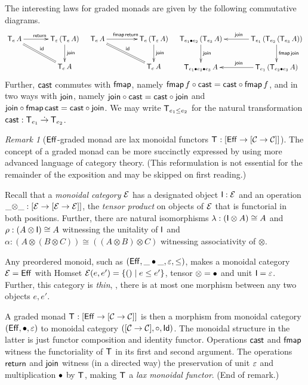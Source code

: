 \documentclass[acmsmall,review,anonymous]{acmart}\settopmatter{printfolios=true,printccs=false,printacmref=false}
\theoremstyle{remark}
\newtheorem{remark}{Remark}
\begin{document}
The interesting laws for graded monads are given by the following
commutative diagrams.
\[
\xymatrix@C=8ex{
  \T[e]\,A     \ar[r]^{\treturn} \ar@{=}[dr]^{\tid}
& \T[\Ge]\,(\T[e]\,A) \ar[d]^{\tjoin}
\\
& \T[e]\,A
}
\quad
\xymatrix@C=10ex{
  \T[e]\,A     \ar[r]^{\tfmap\,\treturn} \ar@{=}[dr]^{\tid}
& \T[e]\,(\T[\Ge]\,A) \ar[d]^{\tjoin}
\\
& \T[e]\,A
}
\quad
\xymatrix@C=8ex{
  \T[e_1 \bu e_2]\,(\T[e_3]\,A) \ar[d]^{\tjoin}
& \T[e_1]\,(\T[e_2]\,(\T[e_3]\,A)) \ar[l]_{\tjoin} \ar[d]^{\tfmap\,\tjoin}
\\
  \T[e_1 \bu e_2 \bu e_3]\,A
& \T[e_1]\,(\T[e_2 \bu e_3]\,A) \ar[l]_{\tjoin}
}
\]
Further, $\tcast$ commutes with $\tfmap$, namely $\tfmap\,f \circ
\tcast = \tcast \circ \tfmap\,f$, and in two ways with $\tjoin$, namely
$\tjoin \circ \tcast = \tcast \circ \tjoin$ and $\tjoin
\circ \tfmap\,\tcast = \tcast \circ \tjoin$.
We may write $\T[e_1 \leq e_2]$ for the natural transformation
$\tcast : \T[e_1] \todot \T[e_2]$.

\begin{remark}[$\Eff$-graded monad are lax monoidal functors $\T : {[\Eff \to [\CC \to \CC]]}$]
The concept of a graded monad can be more succinctly expressed by
using more advanced language of category theory.  (This reformulation
is not essential for the remainder of the exposition and may be
skipped on first reading.)

Recall that a \emph{monoidal category} $\EE$ has a designated object
$\I : \EE$ and an operation $\_{\otimes}\_ : [\EE \to [\EE \to \EE]]$,
the \emph{tensor product} on objects of $\EE$ that is functorial in
both positions.  Further, there are natural isomorphisms
$\Gl : (\I \otimes A) \cong A$ and $\Gr : (A \otimes \I) \cong A$
witnessing the unitality of $\I$ and
$\alpha : (A \otimes (B \otimes C)) \cong ((A \otimes B) \otimes C)$
witnessing associativity of $\otimes$.

Any preordered monoid, such as $(\Eff,\_\bu\_,\Ge,\leq)$, makes a
monoidal category $\EE = \Eff$ with Homset
$\EE(e,e') = \{ () \mid e \leq e' \}$, tensor $\otimes = \bu$ and unit
$\I = \Ge$.  Further, this category is \emph{thin}, \ie, there is at
most one morphism between any two objects $e,e'$.

A graded monad $\T : [\Eff \to [\CC \to \CC]]$ is then a morphism from
monoidal category $(\Eff,\bu,\Ge)$ to monoidal category
$([\CC \to \CC],\comp,\Id)$.  The monoidal structure in the latter is
just functor composition and identity functor.  Operations $\tcast$
and $\tfmap$ witness the functoriality of $\T$ in its first and second
argument.  The operations $\treturn$ and $\tjoin$ witness (in a
directed way) the preservation of unit $\Ge$ and multiplication $\bu$
by $\T$, making $\T$ a \emph{lax monoidal functor}.
(End of remark.)
\end{remark}
\end{document}
